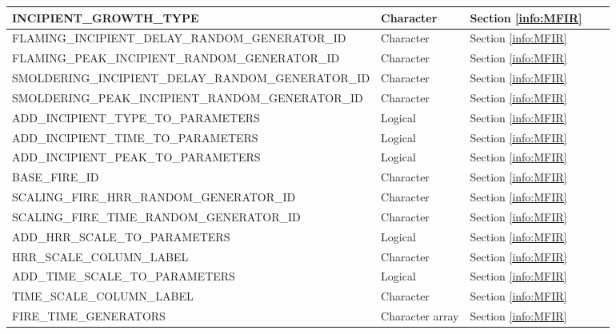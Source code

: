 \begin{landscape}
\begin{longtable}{|l|l|l|l|l|}
{\ct INCIPIENT\_GROWTH\_TYPE}                               & Character         & Section \ref{info:MFIR}   &      &     \\ \hline
{\ct FLAMING\_INCIPIENT\_DELAY\_RANDOM\_GENERATOR\_ID}      & Character         & Section \ref{info:MFIR}   &      &     \\ \hline
{\ct FLAMING\_PEAK\_INCIPIENT\_RANDOM\_GENERATOR\_ID}       & Character         & Section \ref{info:MFIR}   &      &     \\ \hline
{\ct SMOLDERING\_INCIPIENT\_DELAY\_RANDOM\_GENERATOR\_ID}   & Character         & Section \ref{info:MFIR}   &      &     \\ \hline
{\ct SMOLDERING\_PEAK\_INCIPIENT\_RANDOM\_GENERATOR\_ID}    & Character         & Section \ref{info:MFIR}   &      &     \\ \hline
{\ct ADD\_INCIPIENT\_TYPE\_TO\_PARAMETERS}                  & Logical           & Section \ref{info:MFIR}   &      &     \\ \hline
{\ct ADD\_INCIPIENT\_TIME\_TO\_PARAMETERS}                  & Logical           & Section \ref{info:MFIR}   &      &     \\ \hline
{\ct ADD\_INCIPIENT\_PEAK\_TO\_PARAMETERS}                  & Logical           & Section \ref{info:MFIR}   &      &     \\ \hline \hline
{\ct BASE\_FIRE\_ID}                                        & Character         & Section \ref{info:MFIR}   &      &     \\ \hline
{\ct SCALING\_FIRE\_HRR\_RANDOM\_GENERATOR\_ID}             & Character         & Section \ref{info:MFIR}   &      &     \\ \hline
{\ct SCALING\_FIRE\_TIME\_RANDOM\_GENERATOR\_ID}            & Character         & Section \ref{info:MFIR}   &      &     \\ \hline
{\ct ADD\_HRR\_SCALE\_TO\_PARAMETERS}                       & Logical           & Section \ref{info:MFIR}   &      &     \\ \hline
{\ct HRR\_SCALE\_COLUMN\_LABEL}                             & Character         & Section \ref{info:MFIR}   &      &     \\ \hline
{\ct ADD\_TIME\_SCALE\_TO\_PARAMETERS}                      & Logical           & Section \ref{info:MFIR}   &      &     \\ \hline
{\ct TIME\_SCALE\_COLUMN\_LABEL}                            & Character         & Section \ref{info:MFIR}   &      &     \\ \hline \hline
{\ct FIRE\_TIME\_GENERATORS}                                & Character array   & Section \ref{info:MFIR}   &      &     \\ \hline

\end{longtable}
\end{landscape}
